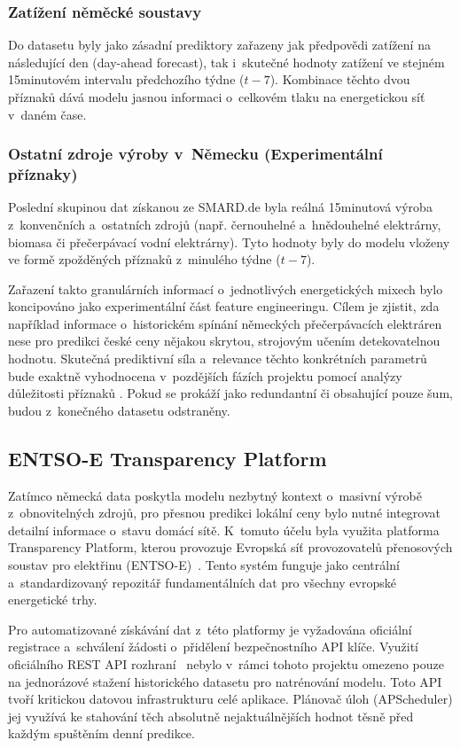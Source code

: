 \documentclass[a4paper]{article}
\begin{document}
\subsubsection{Zatížení něměcké soustavy}
Do datasetu byly jako zásadní prediktory zařazeny jak předpovědi zatížení na následující den (day-ahead forecast), tak i~skutečné hodnoty zatížení ve stejném 15minutovém intervalu předchozího týdne ($t-7$). Kombinace těchto dvou příznaků dává modelu jasnou informaci o~celkovém tlaku na energetickou síť v~daném čase.

\subsubsection{Ostatní zdroje výroby v~Německu (Experimentální příznaky)}
\label{subsubsec:ostatni-zdroje-vyroby-nemecko}
Poslední skupinou dat získanou ze SMARD.de byla reálná 15minutová výroba z~konvenčních a~ostatních zdrojů (např. černouhelné a~hnědouhelné elektrárny, biomasa či přečerpávací vodní elektrárny). Tyto hodnoty byly do modelu vloženy ve formě zpožděných příznaků z~minulého týdne ($t-7$).

Zařazení takto granulárních informací o~jednotlivých energetických mixech bylo koncipováno jako experimentální část feature engineeringu. Cílem je zjistit, zda například informace o~historickém spínání německých přečerpávacích elektráren nese pro predikci české ceny nějakou skrytou, strojovým učením detekovatelnou hodnotu. Skutečná prediktivní síla a~relevance těchto konkrétních parametrů bude exaktně vyhodnocena v~pozdějších fázích projektu pomocí analýzy důležitosti příznaků . Pokud se prokáží jako redundantní či obsahující pouze šum, budou z~konečného datasetu odstraněny.

\subsection{ENTSO-E Transparency Platform}

Zatímco německá data poskytla modelu nezbytný kontext o~masivní výrobě z~obnovitelných zdrojů, pro přesnou predikci lokální ceny bylo nutné integrovat detailní informace o~stavu domácí sítě. K~tomuto účelu byla využita platforma Transparency Platform, kterou provozuje Evropská síť provozovatelů přenosových soustav pro elektřinu (ENTSO-E)~\cite{entsoe}. Tento systém funguje jako centrální a~standardizovaný repozitář fundamentálních dat pro všechny evropské energetické trhy.

Pro automatizované získávání dat z~této platformy je vyžadována oficiální registrace a~schválení žádosti o~přidělení bezpečnostního API klíče. Využití oficiálního REST API rozhraní~\cite{entsoe-api} nebylo v~rámci tohoto projektu omezeno pouze na jednorázové stažení historického datasetu pro natrénování modelu. Toto API tvoří kritickou datovou infrastrukturu celé aplikace. Plánovač úloh (APScheduler) jej využívá ke stahování těch absolutně nejaktuálnějších hodnot těsně před každým spuštěním denní predikce.
\end{document}
